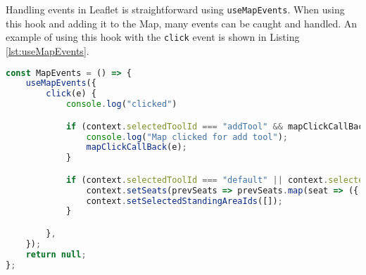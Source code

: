 Handling events in Leaflet is straightforward using \texttt{useMapEvents}. When using this hook and adding it to the Map, many events can be caught and handled. An example of using this hook with the \texttt{click} event is shown in Listing \ref{lst:useMapEvents}.

\begin{lstlisting}[language=Typescript, caption={Handling Events in Leaflet},label={lst:useMapEvents}]
const MapEvents = () => {
    useMapEvents({
        click(e) {
            console.log("clicked")

            if (context.selectedToolId === "addTool" && mapClickCallBack) {
                console.log("Map clicked for add tool");
                mapClickCallBack(e);
            }

            if (context.selectedToolId === "default" || context.selectedToolId === "") {
                context.setSeats(prevSeats => prevSeats.map(seat => ({ ...seat, selected: false })));
                context.setSelectedStandingAreaIds([]);
            }

        },
    });
    return null;
};
\end{lstlisting}

